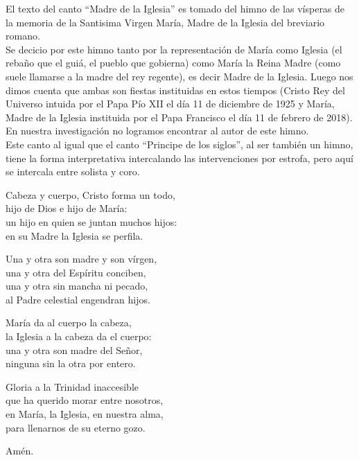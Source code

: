 \documentclass[12pt, letterpaper]{report}
\begin{document}
    \Large El texto del canto ``Madre de la Iglesia'' es tomado del himno de las v\'isperas de la memoria de la Santisima Virgen Mar\'ia, Madre de la Iglesia del breviario romano.\\
    Se decicio por este himno tanto por la representaci\'on de Mar\'ia como Iglesia
    (el reba\~no que el gui\'a, el pueblo que gobierna) como Mar\'ia la Reina Madre (como suele llamarse a la madre del rey regente), es decir Madre de la Iglesia. Luego nos dimos cuenta que ambas son fiestas instituidas en estos tiempos (Cristo Rey del Universo intuida por el Papa P\'io XII el d\'ia 11 de diciembre de 1925 y Mar\'ia, Madre de la Iglesia instituida por el Papa Francisco el d\'ia 11 de febrero de 2018). En nuestra investigaci\'on no logramos encontrar al autor de este himno.\\
    Este canto al igual que el canto ``Principe de los siglos'', al ser tambi\'en un himno, tiene la forma interpretativa intercalando las intervenciones por estrofa, pero aqu\'i se intercala entre solista y coro.

    \noindent
    \LARGE Cabeza y cuerpo, Cristo forma un todo,\\
    hijo de Dios e hijo de Mar\'ia:\\
    un hijo en quien se juntan muchos hijos:\\
    en su Madre la Iglesia se perfila.

    \noindent
    Una y otra son madre y son v\'irgen,\\
    una y otra del Esp\'iritu conciben,\\
    una y otra sin mancha ni pecado,\\
    al Padre celestial engendran hijos.

    \noindent
    Mar\'ia da al cuerpo la cabeza,\\
    la Iglesia a la cabeza da el cuerpo:\\
    una y otra son madre del Se\~nor,\\
    ninguna sin la otra por entero.

    \noindent
    Gloria a la Trinidad inaccesible\\
    que ha querido morar entre nosotros,\\
    en Mar\'ia, la Iglesia, en nuestra alma,\\
    para llenarnos de su eterno gozo.

    \noindent
    Am\'en.
    \clearpage
    
\end{document}

